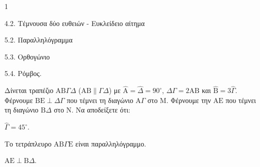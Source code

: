 \begin{ylh}{1}
    \item 4.2. Τέμνουσα δύο ευθειών - Ευκλείδειο αίτημα
    \item 5.2. Παραλληλόγραμμα
    \item 5.3. Ορθογώνιο
    \item 5.4. Ρόμβος.
\end{ylh}
Δίνεται τραπέζιο $\mathrm{A}\mathrm{B}\Gamma\Delta$ ($\mathrm{A}\mathrm{B} \parallel \Gamma\Delta$) με $\hat{\mathrm{A}} = \hat{\Delta} = 90^\circ$, $\Delta\Gamma = 2\mathrm{A}\mathrm{B}$ και $\hat{\mathrm{B}} = 3\hat{\Gamma}$. Φέρνουμε $\mathrm{B}\mathrm{E} \perp \Delta\Gamma$ που τέμνει τη διαγώνιο $\mathrm{A}\Gamma$ στο $\mathrm{M}$. Φέρνουμε την $\mathrm{A}\mathrm{E}$ που τέμνει τη διαγώνιο $\mathrm{B}\Delta$ στο $\mathrm{N}$.
Να αποδείξετε ότι:
\begin{alist}
    \item $\hat{\Gamma} = 45^\circ$. 
    \item Το τετράπλευρο $\mathrm{A}\mathrm{B}\Gamma\mathrm{E}$ είναι παραλληλόγραμμο. 
    \item $\mathrm{A}\mathrm{E} \perp \mathrm{B}\Delta$. 
\end{alist}
